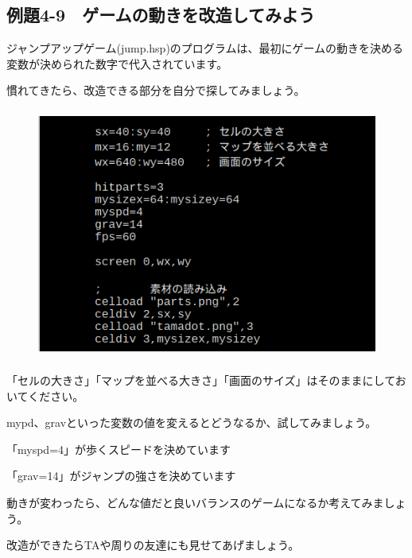 \newpage
\subsection{例題4-9　ゲームの動きを改造してみよう}

\begin{description}
    \item {}
\end{description}



ジャンプアップゲーム(jump.hsp)のプログラムは、最初にゲームの動きを決める変数が決められた数字で代入されています。

慣れてきたら、改造できる部分を自分で探してみましょう。



\begin{figure}[H]
    \begin{center}
      \includegraphics[keepaspectratio,width=11.853cm,height=8.266cm]{text04-img/text04-img026.png}
    \end{center}
    \label{fig:prog_menu}
\end{figure}


「セルの大きさ」「マップを並べる大きさ」「画面のサイズ」はそのままにしておいてください。

mypd、gravといった変数の値を変えるとどうなるか、試してみましょう。

\begin{description}
    \item {}
\end{description}

「myspd=4」が歩くスピードを決めています

「grav=14」がジャンプの強さを決めています

動きが変わったら、どんな値だと良いバランスのゲームになるか考えてみましょう。

改造ができたらTAや周りの友達にも見せてあげましょう。


